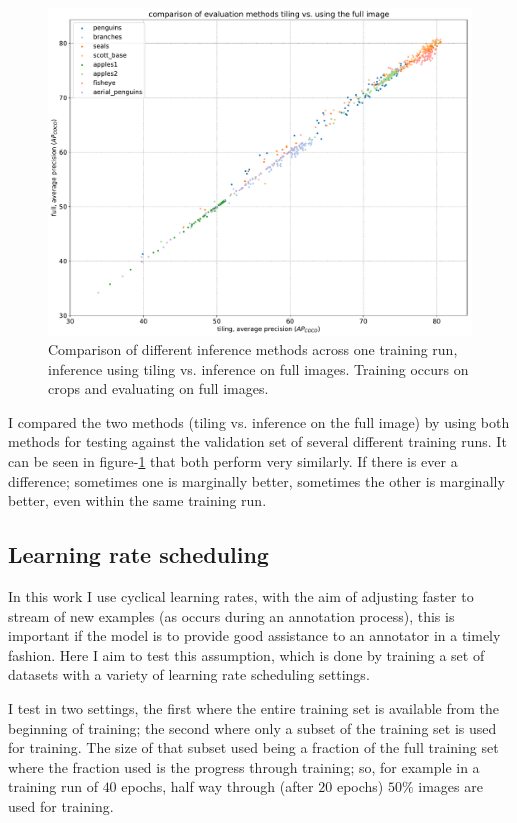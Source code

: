 \begin{figure}[h]
  \centering
  \includegraphics[width=1.0\linewidth]{charts/training/splits_scatters.pdf}
  \caption{Comparison of different inference methods across one training run, inference using tiling vs. inference on full images. Training occurs on crops and evaluating on full images. }  
  \label{fig:inference_method}
\end{figure}


I compared the two methods (tiling vs. inference on the full image) by using both methods for testing against the validation set of several different training runs. It can be seen in figure-\ref{fig:inference_method} that both perform very similarly. If there is ever a difference; sometimes one is marginally better, sometimes the other is marginally better, even within the same training run.


\subsection {Learning rate scheduling}
\label{sec:lr_schedule_exp}

In this work I use cyclical learning rates, with the aim of adjusting faster to stream of new examples (as occurs during an annotation process), this is important if the model is to provide good assistance to an annotator in a timely fashion. Here I aim to test this assumption, which is done by training a set of datasets with a variety of learning rate scheduling settings. 

I test in two settings, the first where the entire training set is available from the beginning of training; the second where only a subset of the training set is used for training. The size of that subset used being a fraction of the full training set where the fraction used is the progress through training; so, for example in a training run of $40$ epochs, half way through (after $20$ epochs) $50\%$ images are used for training. 

